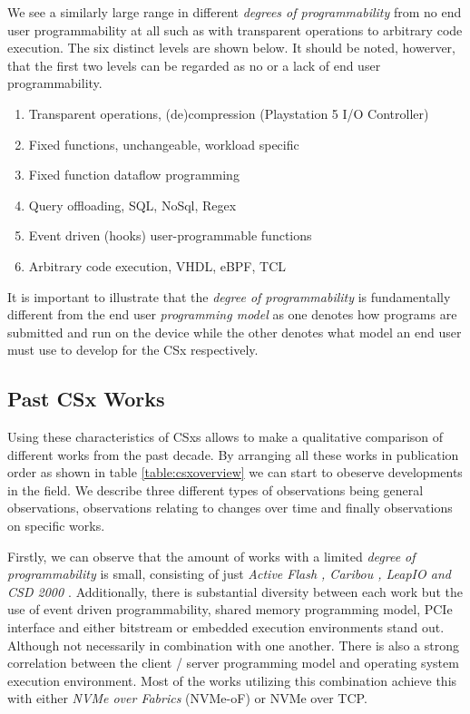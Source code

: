 We see a similarly large range in different \textit{degrees of programmability}
from no end user programmability at all such as with transparent operations to
arbitrary code execution. The six distinct levels are shown below. It
should be noted, howerver, that the first two levels can be regarded as no or a
lack of end user programmability.

\begin{enumerate}
    \item Transparent operations, (de)compression (Playstation 5 I/O Controller)
    \item Fixed functions, unchangeable, workload specific \cite{2013-fast-active-flash}
    \item Fixed function dataflow programming \cite{Wickremesinghe02distributedcomputing}
    \item Query offloading, SQL\footnotemark[3], NoSql, Regex \cite{10.14778/2994509.2994512}
    \item Event driven (hooks) user-programmable functions \cite{10.1145/3429357.3430519}
    \item Arbitrary code execution, VHDL, eBPF, TCL \cite{10.1145/605432.605425, kourtis2020safe}
\end{enumerate}


It is important to illustrate that the \textit{degree of programmability} is
fundamentally different from the end user \textit{programming model} as one
denotes how programs are submitted and run on the device while the other denotes
what model an end user must use to develop for the CSx respectively.

\subsection{Past CSx Works}

Using these characteristics of CSxs allows to make a qualitative comparison of
different works from the past decade. By arranging all these works in
publication order as shown in table \ref{table:csxoverview} we can start to
obeserve developments in the field. We describe three different types of
observations being general observations, observations relating to changes over
time and finally observations on specific works.

Firstly, we can observe that the amount of works with a limited \textit{degree
of programmability} is small, consisting of just \textit{Active Flash
\cite{active-flash-piller, 2013-fast-active-flash},
Caribou \cite{10.14778/3137628.3137632}, LeapIO \cite{10.1145/3373376.3378531}
and CSD 2000 \cite{10.1145/3399666.3399934}}. Additionally, there is substantial
diversity between each work but the use of event driven programmability, shared
memory programming model, PCIe interface and either bitstream or embedded
execution environments stand out. Although not necessarily in combination with
one another. There is also a strong correlation between the client / server
programming model and operating system execution environment. Most of the works
utilizing this combination achieve this with either \textit{NVMe over Fabrics}
(NVMe-oF) or NVMe over TCP.

